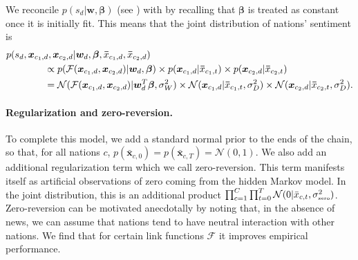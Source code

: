 We reconcile $p(s_d | \bm w, \bm \beta)$ (see )
with  by recalling that $\bm \beta$ is treated as
constant once it is initially fit.  This means that the joint distribution
of nations' sentiment is
\begin{align}
  p(s_d, \bm x_{c_1,d}, \bm x_{c_2,d} | \bm w_d, \bm \beta, \bm \bar
  x_{c_1, d}, \bm \bar x_{c_2, d}) & \nonumber \\
  & \hspace{-110pt} \propto
  p( \mathcal{F}(\bm x_{c_1,d}, \bm x_{c_2,d}) | \bm w_d, \bm \beta)
  \times p(\bm x_{c_1,d} | \bm \bar x_{c_1, t} )
  \times p(\bm x_{c_2,d} | \bm \bar x_{c_2, t} ) \nonumber \\
  & \hspace{-110pt} =
  \mathcal{N}( \mathcal{F}(\bm x_{c_1,d}, \bm x_{c_2,d}) |
  \bm w_d^T \bm \beta, \sigma_W^2 )
  \times \mathcal{N}(\bm x_{c_1,d} | \bm \bar x_{c_1, t}, \sigma_D^2)
  \times \mathcal{N}(\bm x_{c_2,d} | \bm \bar x_{c_2, t}, \sigma_D^2).
\end{align}

\paragraph{Regularization and zero-reversion.} To complete this model,
we add a standard normal prior to the ends of the chain, so that, for
all nations $c$, $p(\bm \bar x_{c, 0}) = p(\bm \bar x_{c,T}) =
\mathcal{N}(0, 1)$.  We also add an additional regularization term
which we call zero-reversion.  This term manifests itself as
artificial observations of zero coming from the hidden Markov model.
In the joint distribution, this is an additional product
$\prod_{c=1}^C \prod_{t=0}^T \mathcal{N}(0 | \bar x_{c,t},
\sigma_{\mbox{\tiny zero}}^2)$.  Zero-reversion can be motivated
anecdotally by noting that, in the absence of news, we can assume that
nations tend to have neutral interaction with other nations.  We find
that for certain link functions $\mathcal{F}$ it improves empirical
performance.


